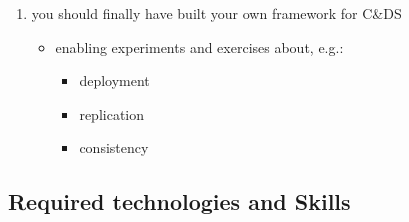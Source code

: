 \documentclass[handout]{beamer}\mode<presentation>{\usetheme{AMSCesenaPurpleAndGold}}
\begin{document}
\begin{frame}[allowframebreaks]
\begin{enumerate}
		\medskip

		\item you should finally have built your own framework for C\&DS
		\begin{itemize}
			\item enabling experiments and exercises about, e.g.:
			\begin{itemize}
				\item deployment
				\item replication
				\item consistency
			\end{itemize}
		\end{itemize}

	\end{enumerate}

\end{frame}

\subsection{Required technologies and Skills}
\end{document}
